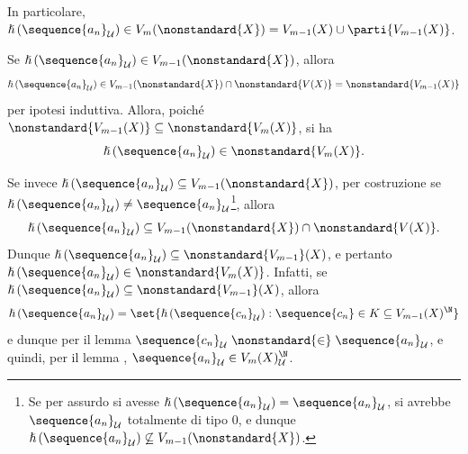 {\begin{enumerate}
\begin{itemize}
\begin{itemize}
                In particolare, $ \hslash\left(\sequence{a_{n} }_{\mathcal{U}}\right) \in V_{m}(\nonstandard{X}) = V_{m-1}(X)\cup \parti{V_{m-1}(X) } $. 

                Se $ \hslash\left(\sequence{a_{n} }_{\mathcal{U}}\right) \in V_{m-1}(\nonstandard{X}) $, allora \begin{equation*}
                    \hslash\left(\sequence{a_{n} }_{\mathcal{U}}\right) \in V_{m-1}(\nonstandard{X})\cap \nonstandard{V(X)} = \nonstandard{V_{m-1}(X) }
                \end{equation*}per ipotesi induttiva. Allora, poiché $ \nonstandard{V_{m-1}(X) } \subseteq \nonstandard{V_{m}(X) } $, si ha \begin{equation*}
                    \hslash\left(\sequence{a_{n} }_{\mathcal{U}}\right) \in \nonstandard{V_{m}(X) }.
                \end{equation*}

                Se invece $ \hslash\left(\sequence{a_{n}}_{\mathcal{U}}\right) \subseteq V_{m-1}(\nonstandard{X}) $, per costruzione se $ \hslash\left(\sequence{a_{n}}_{\mathcal{U}}\right) \neq \sequence{a_{n}}_{\mathcal{U}} $\footnote{Se per assurdo si avesse $ \hslash\left(\sequence{a_{n}}_{\mathcal{U}}\right) = \sequence{a_{n}}_{\mathcal{U}} $, si avrebbe $ \sequence{a_{n}}_{\mathcal{U}} $ totalmente di tipo $ 0 $, e dunque $ \hslash\left(\sequence{a_{n}}_{\mathcal{U}}\right) \not\subseteq V_{m-1}(\nonstandard{X}) $.}, allora \begin{equation*}
                    \hslash\left(\sequence{a_{n}}_{\mathcal{U}}\right) \subseteq V_{m-1}(\nonstandard{X}) \cap \nonstandard{V(X)}.
                \end{equation*}Dunque $ \hslash\left(\sequence{a_{n}}_{\mathcal{U}}\right) \subseteq \nonstandard{V_{m-1}}(X) $, e pertanto $ \hslash\left(\sequence{a_{n}}_{\mathcal{U}}\right) \in \nonstandard{V_{m}(X) } $. Infatti, se $ \hslash\left(\sequence{a_{n}}_{\mathcal{U}}\right) \subseteq \nonstandard{V_{m-1}}(X) $, allora \begin{equation*}
                    \hslash\left(\sequence{a_{n}}_{\mathcal{U}}\right) = \set{\hslash\left(\sequence{c_{n} }_{\mathcal{U}}\right): \sequence{c_{n}} \in K \subseteq V_{m-1}(X)^{\N} }
                \end{equation*}e dunque per il lemma  $ \sequence{c_{n} }_{\mathcal{U}} \mathrel{\nonstandard{\in}} \sequence{a_{n}}_{\mathcal{U}} $, e quindi, per il lemma , $ \sequence{a_{n}}_{\mathcal{U}} \in V_{m}(X)^{\N}_{\mathcal{U}}  $.
            \end{itemize}
        \end{itemize} 


\end{enumerate}}
